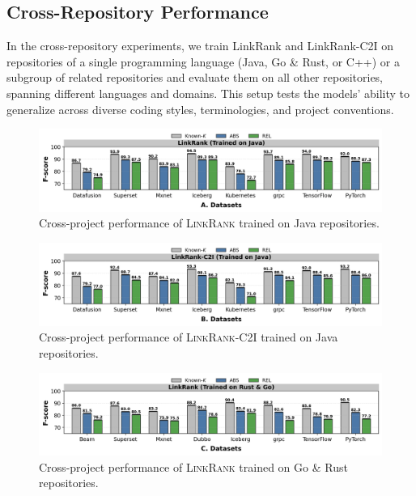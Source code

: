 \subsection{Cross-Repository Performance}

In the cross-repository experiments, we train LinkRank and LinkRank-C2I on repositories of a single programming language (Java, Go \& Rust, or C++) or a subgroup of related repositories and evaluate them on all other repositories, spanning different languages and domains. This setup tests the models' ability to generalize across diverse coding styles, terminologies, and project conventions.

\begin{figure}[H]
  \centering
  \includegraphics[width=\linewidth]{Figures/LR-java.png}
  \caption{Cross-project performance of \textsc{LinkRank} trained on Java repositories. }
  \label{fig:LR-java}
\end{figure}

\begin{figure}[H]
  \centering
  \includegraphics[width=\linewidth]{Figures/lr-C2I-java.png}
  \caption{Cross-project performance of \textsc{LinkRank-C2I} trained on Java repositories.}
  \label{fig:LR-C2I-java}
\end{figure}


\begin{figure}[H]
  \centering
  \includegraphics[width=\linewidth]{Figures/LR-rust.png}
  \caption{Cross-project performance of \textsc{LinkRank} trained on Go \& Rust repositories.}
  \label{fig:LR-rust}
\end{figure}

